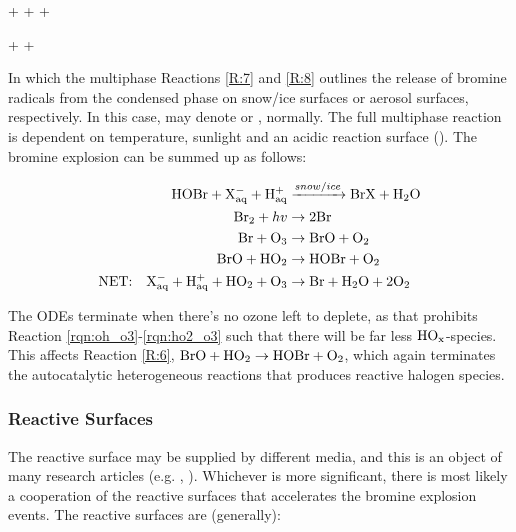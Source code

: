\begin{reaction}
     +  +    +  \label{R:7} 
\end{reaction}
\begin{reaction}
     +    +  \label{R:8}
\end{reaction}


In which the multiphase Reactions \ref{R:7} and \ref{R:8} outlines the release of bromine radicals from the condensed phase on snow/ice surfaces or aerosol surfaces, respectively. In this case,  may denote  or , normally. The full multiphase reaction is dependent on temperature, sunlight and an acidic reaction surface (\cite{Toyota}). The bromine explosion can be summed up as follows: 

\begin{align*}
    \mathrm{HOBr} + \mathrm{X^-_{aq}} + \mathrm{H^+_{aq}} &\xrightarrow{snow/ice} \mathrm{BrX} + \mathrm{H_2O} \\
    \mathrm{Br_2} + hv &\rightarrow 2\mathrm{Br} \\
    \mathrm{Br} + \mathrm{O_3} &\rightarrow \mathrm{BrO} + \mathrm{O_2} \\
    \mathrm{BrO} + \mathrm{HO_2} &\rightarrow \mathrm{HOBr} + \mathrm{O_2} \\
    \text{NET:} \quad \mathrm{X^-_{aq}} + \mathrm{H^+_{aq}} + \mathrm{HO_2} + \mathrm{O_3}  &\rightarrow \mathrm{Br} + \mathrm{H_2O} + 2\mathrm{O_2} 
\end{align*}

\medskip

The ODEs terminate when there's no ozone left to deplete, as that prohibits Reaction \ref{rqn:oh_o3}-\ref{rqn:ho2_o3} such that there will be far less $\mathrm{HO_x}$-species. This affects Reaction \ref{R:6}, $\mathrm{BrO} + \mathrm{HO_2} \rightarrow \mathrm{HOBr} + \mathrm{O_2}$, which again terminates the autocatalytic heterogeneous reactions that produces reactive halogen species. 

\subsubsection{Reactive Surfaces}

The reactive surface may be supplied by different media, and this is an object of many research articles (e.g.  \cite{Simpson2018}, \cite{Rankin}). Whichever is more significant, there is most likely a cooperation of the reactive surfaces that accelerates the bromine explosion events. The reactive surfaces are (generally): 

